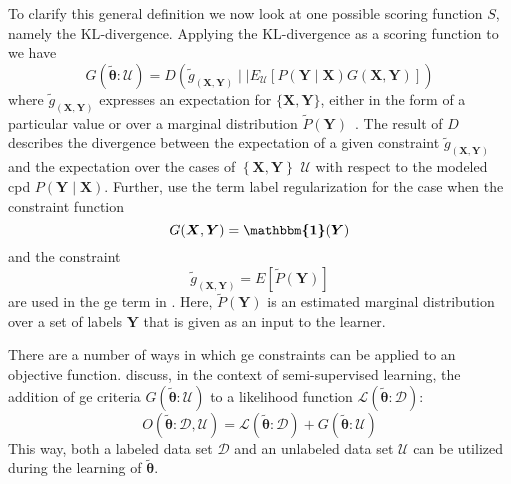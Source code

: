 To clarify this general definition we now look at one possible scoring function $S$, namely the $\text{KL}$-divergence.
Applying the $\text{KL}$-divergence as a scoring function to  we have~\citep{mann2010generalized}
\begin{equation}
  \label{equ:generalized-expectation-kl}
  G(\bm{\tilde{\theta}}:\mathcal{U})=D\left(\tilde{g}_{\left(\bm{X},\bm{Y}\right)}\mid\mid E_{\mathcal{U}}\left[P(\bm{Y}\mid\bm{X})G(\bm{X},\bm{Y})\right]\right)
\end{equation}
where $\tilde{g}_{\left(\bm{X},\bm{Y}\right)}$ expresses an expectation for $\{\bm{X},\bm{Y}\}$, either in the form of a particular value or over a \gls{marginal distribution} $\tilde{P}\left(\bm{Y}\right)$~\citep{mann2010generalized}.
The result of $D$ describes the divergence between the expectation of a given constraint $\tilde{g}_{\left(\bm{X},\bm{Y}\right)}$ and the expectation over the cases of $\left\{\bm{X},\bm{Y}\right\}$ $\mathcal{U}$ with respect to the modeled \gls{cpd} $P(\bm{Y}\mid\bm{X})$.
Further, \citet{mann2010generalized} use the term \gls{label regularization} for the case when the constraint function
\begin{equation}
  \label{equ:label-regularization-constraint-function}
  G(\bm{X},\bm{Y})=\bm{\mathbbm{1}}(\bm{Y})
\end{equation}
and the constraint
\begin{equation}
  \label{equ:label-regularization-constraints}
  \tilde{g}_{\left(\bm{X},\bm{Y}\right)}=E[\tilde{P}(\bm{Y})]
\end{equation}
are used in the \gls{ge} term in .
Here, $\tilde{P}(\bm{Y})$ is an estimated \gls{marginal distribution} over a set of labels $\bm{Y}$ that is given as an input to the learner.

\bigskip

There are a number of ways in which \gls{ge} constraints can be applied to an \gls{objective function}.
\citet{mann2010generalized} discuss, in the context of semi-supervised learning, the addition of \gls{ge} criteria $G(\bm{\tilde{\theta}}:\mathcal{U})$ to a likelihood function $\mathcal{L}(\bm{\tilde{\theta}}:\mathcal{D})$:
\begin{equation}
  \label{equ:objective-function-l-g}
  O(\bm{\tilde{\theta}}:\mathcal{D},\mathcal{U})=\mathcal{L}(\bm{\tilde{\theta}}:\mathcal{D})+G(\bm{\tilde{\theta}}:\mathcal{U})
\end{equation}
This way, both a labeled data set $\mathcal{D}$ and an unlabeled data set $\mathcal{U}$ can be utilized during the learning of $\bm{\tilde{\theta}}$.

